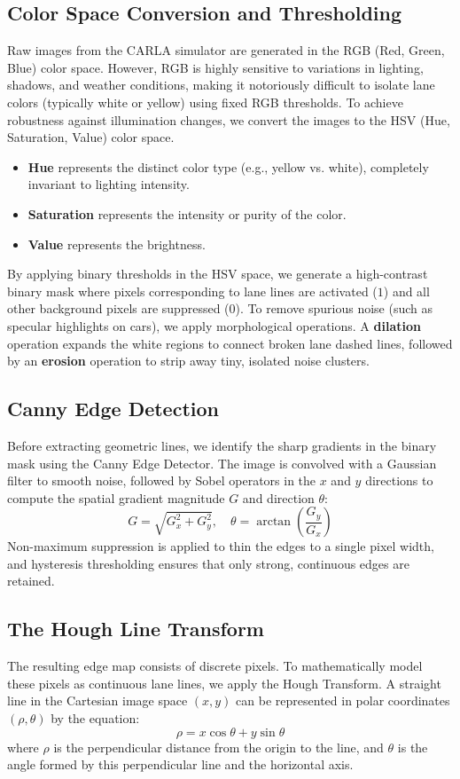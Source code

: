 \documentclass[11pt,a4paper]{report}
\begin{document}
\subsection{Color Space Conversion and Thresholding}
Raw images from the CARLA simulator are generated in the RGB (Red, Green, Blue) color space. However, RGB is highly sensitive to variations in lighting, shadows, and weather conditions, making it notoriously difficult to isolate lane colors (typically white or yellow) using fixed RGB thresholds. To achieve robustness against illumination changes, we convert the images to the HSV (Hue, Saturation, Value) color space. 
\begin{itemize}
    \item \textbf{Hue} represents the distinct color type (e.g., yellow vs. white), completely invariant to lighting intensity.
    \item \textbf{Saturation} represents the intensity or purity of the color.
    \item \textbf{Value} represents the brightness.
\end{itemize}
By applying binary thresholds in the HSV space, we generate a high-contrast binary mask where pixels corresponding to lane lines are activated ($1$) and all other background pixels are suppressed ($0$). To remove spurious noise (such as specular highlights on cars), we apply morphological operations. A \textbf{dilation} operation expands the white regions to connect broken lane dashed lines, followed by an \textbf{erosion} operation to strip away tiny, isolated noise clusters.

\subsection{Canny Edge Detection}
Before extracting geometric lines, we identify the sharp gradients in the binary mask using the Canny Edge Detector. The image is convolved with a Gaussian filter to smooth noise, followed by Sobel operators in the $x$ and $y$ directions to compute the spatial gradient magnitude $G$ and direction $\theta$:
\begin{equation}
    G = \sqrt{G_x^2 + G_y^2}, \quad \theta = \arctan\left(\frac{G_y}{G_x}\right)
\end{equation}
Non-maximum suppression is applied to thin the edges to a single pixel width, and hysteresis thresholding ensures that only strong, continuous edges are retained.

\subsection{The Hough Line Transform}
The resulting edge map consists of discrete pixels. To mathematically model these pixels as continuous lane lines, we apply the Hough Transform. A straight line in the Cartesian image space $(x, y)$ can be represented in polar coordinates $(\rho, \theta)$ by the equation:
\begin{equation}
    \rho = x \cos\theta + y \sin\theta
\end{equation}
where $\rho$ is the perpendicular distance from the origin to the line, and $\theta$ is the angle formed by this perpendicular line and the horizontal axis. 
\end{document}
